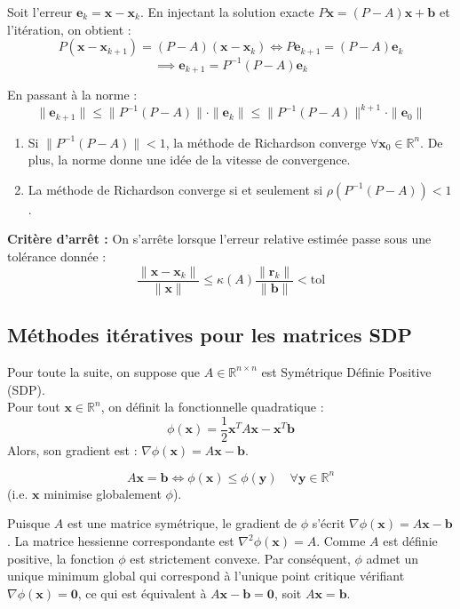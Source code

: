 Soit l'erreur $\mathbf{e}_k = \mathbf{x} - \mathbf{x}_k$. En injectant la solution exacte $P\mathbf{x} = (P-A)\mathbf{x} + \mathbf{b}$ et l'itération, on obtient :
$$P(\mathbf{x} - \mathbf{x}_{k+1}) = (P-A)(\mathbf{x} - \mathbf{x}_k) \iff P \mathbf{e}_{k+1} = (P-A) \mathbf{e}_k$$
$$\implies \mathbf{e}_{k+1} = P^{-1}(P-A) \mathbf{e}_k$$

En passant à la norme :
$$\|\mathbf{e}_{k+1}\| \le \|P^{-1}(P-A)\| \cdot \|\mathbf{e}_k\| \le \|P^{-1}(P-A)\|^{k+1} \cdot \|\mathbf{e}_0\|$$

\begin{theoreme}
\begin{enumerate}
    \item Si $\|P^{-1}(P-A)\| < 1$, la méthode de Richardson converge $\forall \mathbf{x}_0 \in \mathbb{R}^n$. De plus, la norme donne une idée de la vitesse de convergence.
    \item La méthode de Richardson converge si et seulement si $\rho(P^{-1}(P-A)) < 1$.
\end{enumerate}
\end{theoreme}

\textbf{Critère d'arrêt :}
On s'arrête lorsque l'erreur relative estimée passe sous une tolérance donnée :
$$\frac{\|\mathbf{x} - \mathbf{x}_k\|}{\|\mathbf{x}\|} \le \kappa(A) \frac{\|\mathbf{r}_k\|}{\|\mathbf{b}\|} < \text{tol}$$

\subsection{Méthodes itératives pour les matrices SDP}

Pour toute la suite, on suppose que $A \in \mathbb{R}^{n \times n}$ est Symétrique Définie Positive (SDP). \\
Pour tout $\mathbf{x} \in \mathbb{R}^n$, on définit la fonctionnelle quadratique :
$$\phi(\mathbf{x}) = \frac{1}{2} \mathbf{x}^T A \mathbf{x} - \mathbf{x}^T \mathbf{b}$$
Alors, son gradient est : $\nabla \phi(\mathbf{x}) = A\mathbf{x} - \mathbf{b}$.

\begin{proposition}
$$A\mathbf{x} = \mathbf{b} \iff \phi(\mathbf{x}) \le \phi(\mathbf{y}) \quad \forall \mathbf{y} \in \mathbb{R}^n$$
(i.e. $\mathbf{x}$ minimise globalement $\phi$).
\end{proposition}

\begin{explication}
Puisque $A$ est une matrice symétrique, le gradient de $\phi$ s'écrit $\nabla \phi(\mathbf{x}) = A\mathbf{x} - \mathbf{b}$. La matrice hessienne correspondante est $\nabla^2 \phi(\mathbf{x}) = A$. Comme $A$ est définie positive, la fonction $\phi$ est strictement convexe. Par conséquent, $\phi$ admet un unique minimum global qui correspond à l'unique point critique vérifiant $\nabla \phi(\mathbf{x}) = \mathbf{0}$, ce qui est équivalent à $A\mathbf{x} - \mathbf{b} = \mathbf{0}$, soit $A\mathbf{x} = \mathbf{b}$.
\end{explication}

